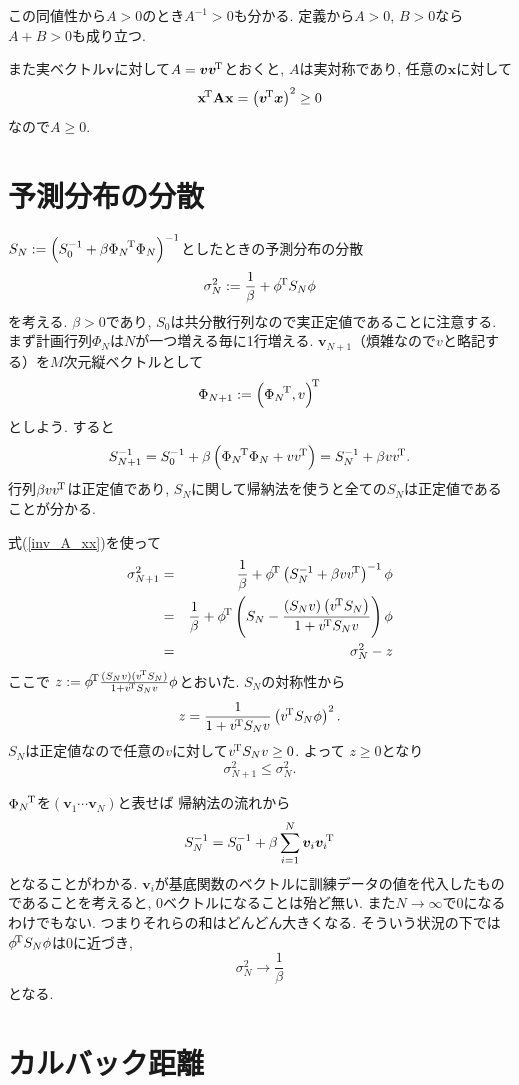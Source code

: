 この同値性から$A>0$のとき$A^{-1}>0$も分かる. 定義から$A>0$, $B>0$なら$A+B>0$も成り立つ.

また実ベクトル$\bm{v}$に対して$A=\bm{v}{\bm{v}}^{\!\mathrm{T}}$とおくと,
$A$は実対称であり, 任意の$\bm{x}$に対して
$${\mathbf{\boldsymbol{x}}}^{\!\mathrm{T}} \mathbf{\boldsymbol{A}} \mathbf{\boldsymbol{x}}=\left({\bm{v}}^{\!\mathrm{T}}\bm{x}\right)^2 \ge 0$$
なので$A \ge 0$.

\section{予測分布の分散}
$S_N:=\left(S_0^{-1} + \beta {\Phi_N}^{\!\mathrm{T}}\Phi_N\right)^{-1}$としたときの予測分布の分散
$$\sigma_N^2:=\frac{1}{\beta}+{\phi}^{\!\mathrm{T}} S_N \phi$$
を考える. $\beta>0$であり, $S_0$は共分散行列なので実正定値であることに注意する.
まず計画行列$\Phi_N$は$N$が一つ増える毎に1行増える.
$\bm{v}_{N+1}$（煩雑なので$v$と略記する）を$M$次元縦ベクトルとして
$$\Phi_{N+1}:={\left({\Phi_N}^{\!\mathrm{T}}, v\right)}^{\!\mathrm{T}}$$
としよう. すると
\pagebreak
$$
S_{N+1}^{-1}
 =S_0^{-1} + \beta\left({\Phi_N}^{\!\mathrm{T}}\Phi_N + v{v}^{\!\mathrm{T}}\right)
 = S_N^{-1} + \beta v{v}^{\!\mathrm{T}}.
$$
行列$\beta v{v}^{\!\mathrm{T}}$は正定値であり, $S_N$に関して帰納法を使うと全ての$S_N$は正定値であることが分かる.

式(\ref{inv_A_xx})を使って
\begin{eqnarray*}
\sigma_{N+1}^2&=&\frac{1}{\beta} + {\phi}^{\!\mathrm{T}}\left(S_N^{-1} + \beta v{v}^{\!\mathrm{T}}\right)^{-1}\phi\\
 &=& \frac{1}{\beta} + {\phi}^{\!\mathrm{T}}\left(S_N - \frac{\left(S_N v\right)\left({v}^{\!\mathrm{T}} S_N\right)}{1+{v}^{\!\mathrm{T}}S_Nv}\right)\phi\\
 &=& \sigma_N^2 - z
\end{eqnarray*}
ここで
$z := {\phi}^{\!\mathrm{T}}\frac{(S_N v)({v}^{\!\mathrm{T}} S_N)}{1+{v}^{\!\mathrm{T}}S_Nv}\phi$とおいた.
$S_N$の対称性から
$$
z = \frac{1}{1+{v}^{\!\mathrm{T}}S_Nv} \left({v}^{\!\mathrm{T}}S_N\phi\right)^2.
$$
$S_N$は正定値なので任意の$v$に対して${v}^{\!\mathrm{T}}S_Nv \ge 0$.
よって $z \ge 0$となり
$$\sigma_{N+1}^2 \le \sigma_N^2.$$

${\Phi_N}^{\!\mathrm{T}}$を$\left(\bm{v}_1 \cdots \bm{v}_N \right)$と表せば
帰納法の流れから
$$
S_N^{-1}=S_0^{-1}+\beta \sum_{i=1}^N \bm{v}_i{\bm{v}_i}^{\!\mathrm{T}}
$$
となることがわかる.
$\bm{v}_i$が基底関数のベクトルに訓練データの値を代入したものであることを考えると, $0$ベクトルになることは殆ど無い.
また$N \rightarrow \infty$で$0$になるわけでもない.
つまりそれらの和はどんどん大きくなる. そういう状況の下では${\phi}^{\!\mathrm{T}}S_N\phi$は$0$に近づき,
$$\sigma_N^2 \rightarrow \frac{1}{\beta}$$
となる.

\section{カルバック距離}

